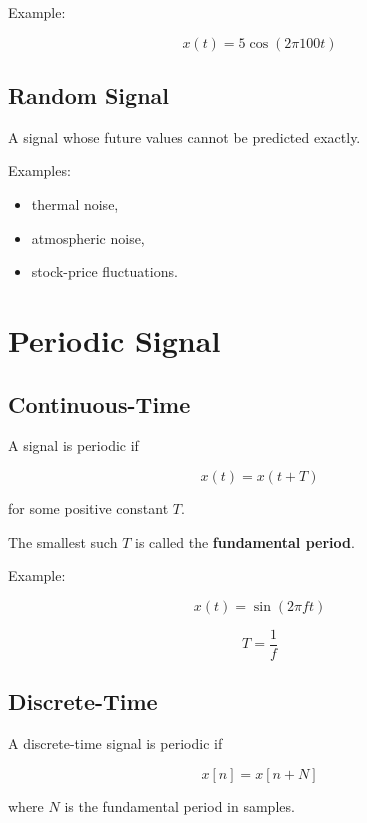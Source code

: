 Example:

\[
x(t)=5\cos(2\pi 100t)
\]


\subsection{Random Signal}

A signal whose future values cannot be predicted exactly.

Examples:

\begin{itemize}
\item thermal noise,
\item atmospheric noise,
\item stock-price fluctuations.
\end{itemize}


\section{Periodic Signal}

\subsection{Continuous-Time}

A signal is periodic if

\[
\boxed{
x(t)=x(t+T)
}
\]

for some positive constant \(T\).

The smallest such \(T\) is called the
\textbf{fundamental period}.

Example:

\[
x(t)=\sin(2\pi f t)
\]

\[
T=\frac{1}{f}
\]


\subsection{Discrete-Time}

A discrete-time signal is periodic if

\[
\boxed{
x[n]=x[n+N]
}
\]

where \(N\) is the fundamental period in samples.

